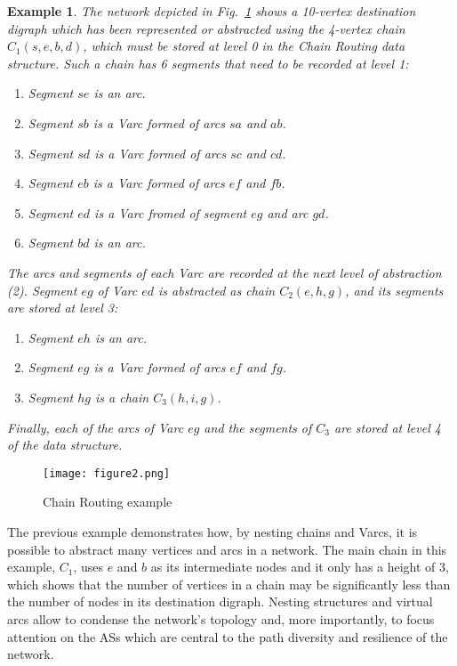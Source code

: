 \documentclass[5p,twocolumn]{elsarticle}
\newtheorem{example}{Example}
\begin{document}
\begin{example}
The network depicted in Fig.\ \ref{fig:AlgorithmExample} shows a 10-vertex destination digraph which has been represented or abstracted using the 4-vertex chain $C_1(s,e,b,d)$, which must be stored at level 0 in the Chain Routing data structure. Such a chain has 6 segments that need to be recorded at level 1:

\begin{enumerate}
	\item Segment $se$ is an arc.
	\item Segment $sb$ is a Varc formed of arcs $sa$ and $ab$.
	\item Segment $sd$ is a Varc formed of arcs $sc$ and $cd$.
	\item Segment $eb$ is a Varc formed of arcs $ef$ and $fb$.
	\item Segment $ed$ is a Varc fromed of segment $eg$ and arc $gd$.
	\item Segment $bd$ is an arc.
\end{enumerate}

The arcs and segments of each Varc are recorded at the next level of abstraction (2). Segment $eg$ of Varc $ed$ is abstracted as chain $C_2(e,h,g)$, and its segments are stored at level 3:

\begin{enumerate}
	\item Segment $eh$ is an arc.
	\item Segment $eg$ is a Varc formed of arcs $ef$ and $fg$.
	\item Segment $hg$ is a chain $C_3(h,i,g)$.
\end{enumerate}

Finally, each of the arcs of Varc $eg$ and the segments of $C_3$ are stored at level 4 of the data structure.
\end{example}

\begin{figure}[!t]
	\centering
	\texttt{[image: figure2.png]}
	\caption{Chain Routing example}
	\label{fig:AlgorithmExample}
\end{figure}



The previous example demonstrates how, by nesting chains and Varcs, it is possible to abstract many vertices and arcs in a network. The main chain in this example, $C_1$, uses $e$ and $b$ as its intermediate nodes and it only has a height of 3, which shows that the number of vertices in a chain may be significantly less than the number of nodes in its destination digraph. Nesting structures and virtual arcs allow to condense the network's topology and, more importantly, to focus attention on the ASs which are central to the path diversity and resilience of the network.
\end{document}
